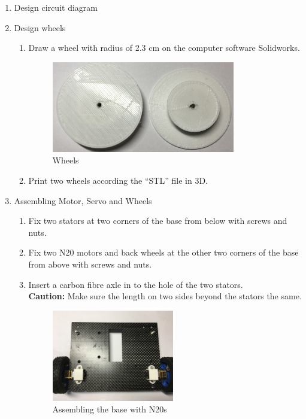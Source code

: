 \begin{enumerate}
\begin{enumerate}
	\end{enumerate}
\item Design circuit diagram
\item Design wheels
	\begin{enumerate}
	\item Draw a wheel with radius of 2.3 cm on the computer software Solidworks.
	\begin{figure}[H]
	\begin{center}
	\includegraphics[width=8cm]{figure/procedure/p3}
	\end{center}
 	\caption{Wheels \label{fig:wheels}}
	\end{figure}
	\item Print two wheels according the ``STL'' file in 3D.
	\end{enumerate}
\item Assembling Motor, Servo and Wheels
	\begin{enumerate}
	\item Fix two stators at two corners of the base from below with screws and nuts. 
	\item Fix two N20 motors and back wheels at the other two corners of the base from above with screws and nuts.
	\item Insert a carbon fibre axle in to the hole of the two stators. \\
	\textbf{Caution:} Make sure the length on two sides beyond the stators the same. 
	\begin{figure}[H]
	\begin{minipage}{0.48\textwidth}
	\centering
	\includegraphics[height=4cm]{figure/procedure/p4}
 	\caption{Assembling the base with N20s \label{fig:step43}}
	\end{minipage}

\end{figure}
\end{enumerate}
\end{enumerate}
